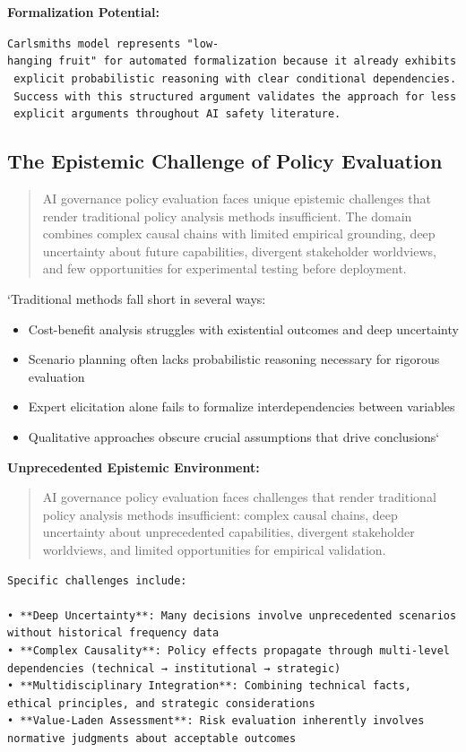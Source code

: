\documentclass[
  11pt,
  letterpaper,
]{book}
\providecommand{\tightlist}{%
  \setlength{\itemsep}{0pt}\setlength{\parskip}{0pt}}
\begin{document}
\textbf{Formalization Potential:}

\texttt{Carlsmith\textquotesingle{}s\ model\ represents\ "low-hanging\ fruit"\ for\ automated\ formalization\ because\ it\ already\ exhibits\ explicit\ probabilistic\ reasoning\ with\ clear\ conditional\ dependencies.\ Success\ with\ this\ structured\ argument\ validates\ the\ approach\ for\ less\ explicit\ arguments\ throughout\ AI\ safety\ literature.}

\subsection{The Epistemic Challenge of Policy
Evaluation}\label{sec-epistemic-challenge}

\begin{quote}
AI governance policy evaluation faces unique epistemic challenges that
render traditional policy analysis methods insufficient. The domain
combines complex causal chains with limited empirical grounding, deep
uncertainty about future capabilities, divergent stakeholder worldviews,
and few opportunities for experimental testing before deployment.
\end{quote}

`Traditional methods fall short in several ways:

\begin{itemize}
\tightlist
\item
  Cost-benefit analysis struggles with existential outcomes and deep
  uncertainty
\item
  Scenario planning often lacks probabilistic reasoning necessary for
  rigorous evaluation
\item
  Expert elicitation alone fails to formalize interdependencies between
  variables
\item
  Qualitative approaches obscure crucial assumptions that drive
  conclusions`
\end{itemize}

\textbf{Unprecedented Epistemic Environment:}

\begin{quote}
AI governance policy evaluation faces challenges that render traditional
policy analysis methods insufficient: complex causal chains, deep
uncertainty about unprecedented capabilities, divergent stakeholder
worldviews, and limited opportunities for empirical validation.
\end{quote}

\begin{verbatim}
Specific challenges include:

• **Deep Uncertainty**: Many decisions involve unprecedented scenarios without historical frequency data
• **Complex Causality**: Policy effects propagate through multi-level dependencies (technical → institutional → strategic)
• **Multidisciplinary Integration**: Combining technical facts, ethical principles, and strategic considerations
• **Value-Laden Assessment**: Risk evaluation inherently involves normative judgments about acceptable outcomes
\end{verbatim}
\end{document}
